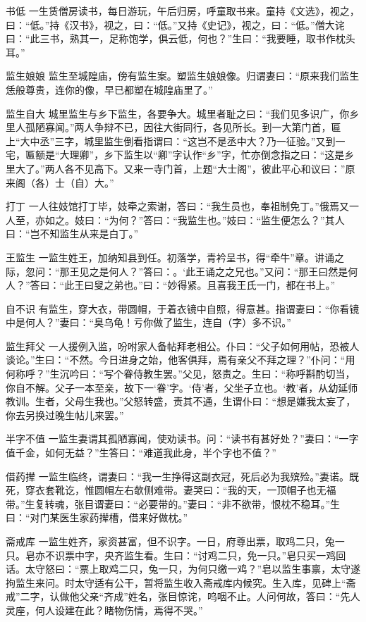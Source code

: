 \documentclass[12pt,UTF8]{ctexbook}
\begin{document}
书低
一生赁僧房读书，每日游玩，午后归房，呼童取书来。童持《文选》，视之，曰：“低。”持《汉书》，视之，曰：“低。”又持《史记》，视之，曰：“低。”僧大诧曰：“此三书，熟其一，足称饱学，俱云低，何也？”生曰：“我要睡，取书作枕头耳。”

监生娘娘
监生至城隍庙，傍有监生案。塑监生娘娘像。归谓妻曰：“原来我们监生恁般尊贵，连你的像，早已都塑在城隍庙里了。”

监生自大
城里监生与乡下监生，各要争大。城里者耻之曰：“我们见多识广，你乡里人孤陋寡闻。”两人争辩不已，因往大街同行，各见所长。到一大第门首，匾上“大中丞”三字，城里监生倒看指谓曰：“这岂不是丞中大？乃一征验。”又到一宅，匾额是“大理卿”，乡下监生以“卿”字认作“乡”字，忙亦倒念指之曰：“这是乡里大了。”两人各不见高下。又来一寺门首，上题“大士阁”，彼此平心和议曰：”原来阁（各）士（自）大。”

打丁
一人往妓馆打丁毕，妓牵之索谢，答曰：“我生员也，奉祖制免丁。”俄焉又一人至，亦如之。妓曰：“为何？”答曰：“我监生也。”妓曰：“监生便怎么？”其人曰：“岂不知监生从来是白丁。”

王监生
一监生姓王，加纳知县到任。初落学，青衿呈书，得“牵牛”章。讲诵之际，忽问：“那王见之是何人？”答曰：。‘此王诵之之兄也。”又问：“那王曰然是何人？”答曰：“此王曰叟之弟也。”曰：“妙得紧。且喜我王氏一门，都在书上。”

自不识
有监生，穿大衣，带圆帽，于着衣镜中自照，得意甚。指谓妻曰：“你看镜中是何人？”妻曰：“臭乌龟！亏你做了监生，连自（字）多不识。”

监生拜父
一人援例入监，吩咐家人备帖拜老相公。仆曰：“父子如何用帖，恐被人谈论。”生曰：“不然。今日进身之始，他客俱拜，焉有亲父不拜之理？”仆问：“用何称呼？”生沉吟曰：“写个眷侍教生罢。”父见，怒责之。生曰：“称呼斟酌切当，你自不解。父子一本至亲，故下一‘眷’字。‘侍’者，父坐子立也。‘教’者，从幼延师教训。生者，父母生我也。”父怒转盛，责其不通，生谓仆曰：“想是嫌我太妄了，你去另换过晚生帖儿来罢。”

半字不值
一监生妻谓其孤陋寡闻，使劝读书。问：“读书有甚好处？”妻曰：“一字值千金，如何无益？”生答曰：“难道我此身，半个字也不值？”

借药撵
一监生临终，谓妻曰：“我一生挣得这副衣冠，死后必为我殡殓。”妻诺。既死，穿衣套靴讫，惟圆帽左右欹侧难带。妻哭曰：“我的天，一顶帽子也无福带。”生复转魂，张目谓妻曰：“必要带的。”妻曰：“非不欲带，恨枕不稳耳。”生曰：“对门某医生家药撵槽，借来好做枕。”

斋戒库
一监生姓齐，家资甚富，但不识字。一日，府尊出票，取鸡二只，兔一只。皂亦不识票中字，央齐监生看。生曰：“讨鸡二只，免一只。”皂只买一鸡回话。太守怒曰：“票上取鸡二只，兔一只，为何只缴一鸡？”皂以监生事禀，太守遂拘监生来问。时太守适有公干，暂将监生收入斋戒库内候究。生入库，见碑上“斋戒”二字，认做他父亲“齐成”姓名，张目惊诧，呜咽不止。人问何故，答曰：“先人灵座，何人设建在此？睹物伤情，焉得不哭。”
\end{document}
